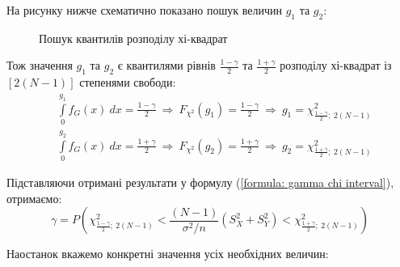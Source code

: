 На рисунку нижче схематично показано пошук величин $g_1$ та $g_2:$

\begin{figure}[H]
    \vspace{0.3cm}
    \caption{Пошук квантилів розподілу хі-квадрат}
    \label{figure: chi interval}
\end{figure}

Тож значення $g_1$ та $g_2$ є квантилями рівнів $\frac{1-\gamma}{2}$ та $\frac{1+\gamma}{2}$ розподілу 
хі-квадрат із $\left[ 2(N-1) \right]$ степенями свободи:
\begin{align*}
    &\int\limits_{0}^{g_1}f_G(x)\ dx=\tfrac{1-\gamma}{2}\ \Rightarrow\ 
        F_{\chi^2}(g_1)=\tfrac{1-\gamma}{2}\ \Rightarrow\
        g_1=\chi^2_{\tfrac{1-\gamma}{2};\ 2(N-1)} \\
    &\int\limits_{0}^{g_2}f_G(x)\ dx=\tfrac{1+\gamma}{2}\ \Rightarrow\ 
        F_{\chi^2}(g_2)=\tfrac{1+\gamma}{2}\ \Rightarrow\
        g_2=\chi^2_{\tfrac{1+\gamma}{2};\ 2(N-1)}
\end{align*}

Підставляючи отримані результати у формулу (\ref{formula: gamma chi interval}), отримаємо:
\begin{equation}
    \gamma = P\left( 
        \chi^2_{\tfrac{1-\gamma}{2};\ 2(N-1)} < 
        \frac{(N-1)}{\sigma^2/n}\left( S_X^2+S_Y^2 \right) < 
        \chi^2_{\tfrac{1+\gamma}{2};\ 2(N-1)} 
    \right) \label{formula: UKR chi trusted interval}
\end{equation}

\newpage
Наостанок вкажемо конкретні значення усіх необхідних величин:

